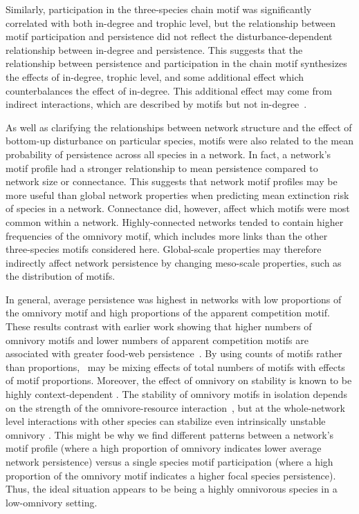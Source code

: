 \documentclass[12pt]{article}
\begin{document}
\begin{spacing}{2.0}
    
    Similarly, participation in the three-species chain motif was significantly correlated with both in-degree and trophic level, but the relationship between motif participation and persistence did not reflect the disturbance-dependent relationship between in-degree and persistence.
    This suggests that the relationship between persistence and participation in the chain motif synthesizes the effects of in-degree, trophic level, and some additional effect which counterbalances the effect of in-degree.
    This additional effect may come from indirect interactions, which are described by motifs but not in-degree~\citep{Cirtwill2018FoodWebs}. 
    
    
    As well as clarifying the relationships between network structure and the effect of bottom-up disturbance on particular species, motifs were also related to the mean probability of persistence across all species in a network.
    In fact, a network's motif profile had a stronger relationship to mean persistence compared to network size or connectance. 
    This suggests that network motif profiles may be more useful than global network properties when predicting mean extinction risk of species in a network.
    Connectance did, however, affect which motifs were most common within a network. 
    Highly-connected networks tended to contain higher frequencies of the omnivory motif, which includes more links than the other three-species motifs considered here.
    Global-scale properties may therefore indirectly affect network persistence by changing meso-scale properties, such as the distribution of motifs. 
    
    
    In general, average persistence was highest in networks with low proportions of the omnivory motif and high proportions of the apparent competition motif. 
    These results contrast with earlier work showing that higher numbers of omnivory motifs and lower numbers of apparent competition motifs are associated with greater food-web persistence~\citep{Stouffer2010b}.
    By using counts of motifs rather than proportions,~\citet{Stouffer2010b} may be mixing effects of total numbers of motifs with effects of motif proportions.
    Moreover, the effect of omnivory on stability is known to be highly context-dependent \citep{bascompte2005simple, Monteiro2016,McLeod2021}. 
    The stability of omnivory motifs in isolation depends on the strength of the omnivore-resource interaction~\citep{McLeod2021}, but at the whole-network level interactions with other species can stabilize even intrinsically unstable omnivory \citep{Kratina2012}. 
    This might be why we find different patterns between a network's motif profile (where a high proportion of omnivory indicates lower average network persistence) versus a single species motif participation (where a high proportion of the omnivory motif indicates a higher focal species persistence).
    Thus, the ideal situation appears to be being a highly omnivorous species in a low-omnivory setting. 
    

\end{spacing}
\end{document}

